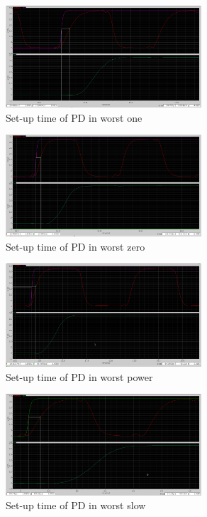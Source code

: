 \documentclass[a4paper,12pt]{article} \usepackage{graphicx}
\begin{document}
\begin{figure}[h]
  \centering
  \includegraphics[width=0.65\textwidth]{../Bilder/Layout/simulations/pd_wo.png}
  \caption{Set-up time of PD in worst one}
  \label{fig:PDwo}
\end{figure}

\begin{figure}[h]
  \centering
  \includegraphics[width=0.65\textwidth]{../Bilder/Layout/simulations/pd_wz.png}
  \caption{Set-up time of PD in worst zero}
  \label{fig:PDwz}
\end{figure}

\begin{figure}[h]
  \centering
  \includegraphics[width=0.65\textwidth]{../Bilder/Layout/simulations/pd_wp.png}
  \caption{Set-up time of PD in worst power}
  \label{fig:PDwp}
\end{figure}

\begin{figure}[h]
  \centering
  \includegraphics[width=0.65\textwidth]{../Bilder/Layout/simulations/pd_ws.png}
  \caption{Set-up time of PD in worst slow}
  \label{fig:PDws}
\end{figure}
\end{document}
